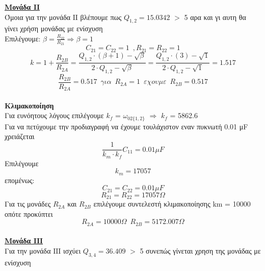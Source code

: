 \documentclass{article}
\begin{document}
{\large{ \underline{\textbf{Μονάδα IΙ}} \\[0.4\baselineskip]}
\large{}
Όμοια για την μονάδα ΙΙ βλέπουμε πως $Q_{1,2} = 15.0342$ $>$ 5 αρα και γι αυτη θα γίνει χρήση μονάδας με ενίσχυση
\\[0.4\baselineskip]
Επιλέγουμε: $β = \frac{R_{22}}{R_{21}} \Rightarrow β = 1$ 
\begin{equation*}
C_{21} = C_{22} = 1 \enspace ,R_{21} = R_{22} = 1
\end{equation*}
\begin{equation*}
k = 1 + \frac{R_{2B}}{R_{2A}} = \frac{Q_{1,2} \cdot (β+1) - \sqrt{β}}{2 \cdot Q_{1,2} - \sqrt{β}} = \frac{Q_{1,2} \cdot (3) - \sqrt{1}}{2 \cdot Q_{1,2} - \sqrt{1}} = 1.517
\end{equation*}
\begin{equation*}
\frac{R_{2B}}{R_{2A}} = 0.517 \enspace για \enspace R_{2A} = 1 \enspace εχουμε \enspace R_{2B} = 0.517
\end{equation*}
\\[0.4\baselineskip]
\large{ {\textbf{Κλιμακοποίηση}} \\[0.4\baselineskip]}
\large{}
Για ευνόητους λόγους επιλέγουμε $k_f$ = $ω_{02\{1,2\}}$  $\Rightarrow$ $k_f$ = 5862.6 \\[0.4\baselineskip] 
Για να πετύχουμε την προδιαγραφή να έχουμε τουλάχιστον εναν πυκνωτή 0.01 μF χρειάζεται
\begin{equation*}
\frac{1}{k_m \cdot k_f} C_{11}= 0.01μF
\end{equation*}
Επιλέγουμε
\begin{equation*}
k_m = 17057
\end{equation*}
επομένως:
\begin{equation*}
\boxed{
C_{21} = C_{22} = 0.01μF
}
\end{equation*}
\begin{equation*}
\boxed{
R_{21} = R_{22} = 17057 Ω
}
\end{equation*}
Για τις μονάδες $R_{2A}$ και $R_{2B}$ επιλέγουμε συντελεστή κλιμακοποίησης km = 10000 οπότε προκύπτει
\begin{equation*}
\boxed{R_{2A} = 10000  Ω} \enspace \boxed{R_{2B} = 5172.007 Ω}
\end{equation*}
\\[0.4\baselineskip]
\large{ \underline{\textbf{Μονάδα IΙΙ}} \\[0.4\baselineskip]}
\large{}
Για την μονάδα ΙΙΙ ισχύει $Q_{3,4} = 36.409$ $>$ 5
συνεπώς γίνεται χρηση της μονάδας με ενίσχυση
\\[0.4\baselineskip]
}
\end{document}
